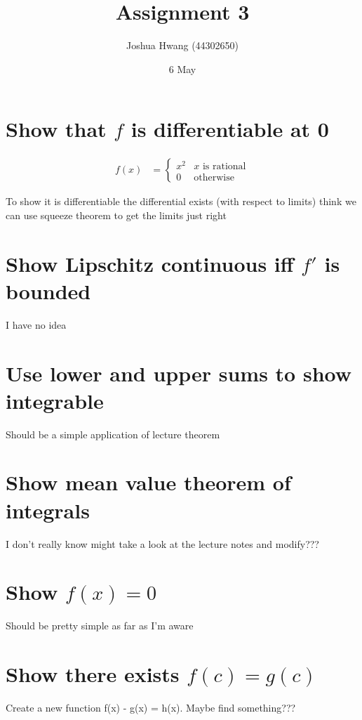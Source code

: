 \documentclass{article}
\title{Assignment 3}
\author{Joshua Hwang (44302650)}
\date{6 May}
\begin{document}
\maketitle

\section{Show that $f$ is differentiable at 0}
\begin{align*}
    f(x)
    &=
    \begin{cases}
        x^2 & \text{$x$ is rational} \\
        0 & \text{otherwise}
    \end{cases}
\end{align*}

To show it is differentiable
the differential exists (with respect to limits)
think we can use squeeze theorem to get the limits just right

\section{Show Lipschitz continuous iff $f'$ is bounded}
I have no idea

\section{Use lower and upper sums to show integrable}
Should be a simple application of lecture theorem

\section{Show mean value theorem of integrals}
I don't really know
might take a look at the lecture notes and modify???

\section{Show $f(x) = 0$}
Should be pretty simple as far as I'm aware

\section{Show there exists $f(c) = g(c)$}
Create a new function f(x) - g(x) = h(x). Maybe find something???
\end{document}
